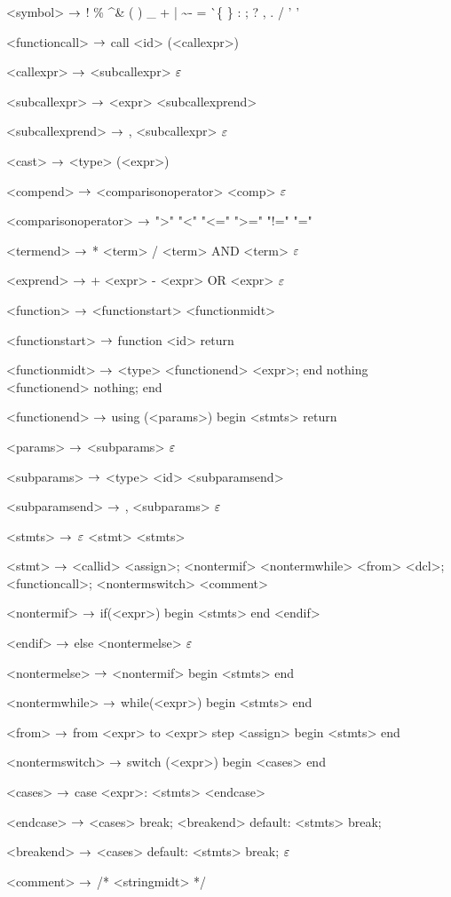 \begin{grammar}
<symbol> $\rightarrow$ !
\alt \%
\alt \^
\alt \&
\alt (
\alt )
\alt \_
\alt +
\alt |
\alt \~
\alt -
\alt =
\alt \`
\alt \{
\alt \}
\alt [
\alt ]
\alt :
\alt ;
\alt ?
\alt ,
\alt .
\alt /
\alt ' '

<functioncall> $\rightarrow$ call <id> (<callexpr>)

<callexpr> $\rightarrow$ <subcallexpr>
\alt $\varepsilon$

<subcallexpr> $\rightarrow$ <expr> <subcallexprend>

<subcallexprend> $\rightarrow$ , <subcallexpr>
\alt $\varepsilon$

<cast> $\rightarrow$ <type> (<expr>)

<compend> $\rightarrow$ <comparisonoperator> <comp>
\alt $\varepsilon$

<comparisonoperator> $\rightarrow$ ">"
				\alt "<"
				\alt "<="
				\alt ">="
				\alt "!="
				\alt "="

<termend> $\rightarrow$ * <term>
\alt / <term>
\alt AND <term>
\alt $\varepsilon$

<exprend> $\rightarrow$ + <expr>
\alt - <expr>
\alt OR <expr>
\alt $\varepsilon$

<function> $\rightarrow$  <functionstart> <functionmidt>

<functionstart> $\rightarrow$ function <id> return

<functionmidt> $\rightarrow$ <type> <functionend> <expr>; end
\alt nothing <functionend> nothing; end

<functionend> $\rightarrow$
using (<params>)
begin
	<stmts>
	return

<params> $\rightarrow$ <subparams>
	\alt $\varepsilon$

<subparams> $\rightarrow$ <type> <id> <subparamsend>

<subparamsend> $\rightarrow$ , <subparams>
\alt $\varepsilon$

<stmts> $\rightarrow$ $\varepsilon$
	\alt <stmt> <stmts>

<stmt> $\rightarrow$ <callid> <assign>;
	\alt <nontermif>
	\alt <nontermwhile>
	\alt <from>
	\alt <dcl>;
	\alt <functioncall>;
	\alt <nontermswitch>
	\alt <comment>
	
<nontermif> $\rightarrow$ if(<expr>)
	begin
		<stmts>
	end
	<endif>

<endif> $\rightarrow$ 
	else <nontermelse>
	\alt $\varepsilon$

<nontermelse> $\rightarrow$ <nontermif>
	\alt begin
		<stmts>
	end

<nontermwhile> $\rightarrow$ while(<expr>)
		begin
			<stmts>
		end
		
<from> $\rightarrow$ from <expr> to <expr> step <assign>
	begin
		<stmts>
	end

<nontermswitch> $\rightarrow$ switch (<expr>)
		begin
			<cases>
		end

<cases> $\rightarrow$ case <expr>:
			<stmts>
		<endcase>
		
<endcase> $\rightarrow$ <cases>
		\alt break; <breakend>
		\alt default:
			<stmts>
			break;

<breakend> $\rightarrow$ <cases>
\alt default:
<stmts>
break;
\alt $\varepsilon$

<comment> $\rightarrow$ /* <stringmidt> */


\end{grammar}